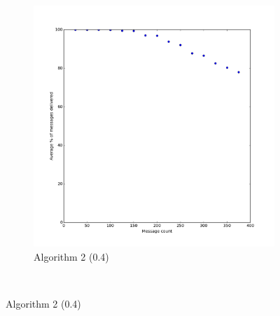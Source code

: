 \documentclass[bsc,frontabs,twoside,singlespacing,parskip,deptreport]{infthesis}     %
\begin{document}
\begin{figure}
\begin{subfigure}[b]{0.3\textwidth}
        \includegraphics[width=\textwidth]{results/BasicShare_Prob40}
        \caption{Algorithm 2 (0.4)}
        \label{fig:results/BasicShare_Prob40}
    \end{subfigure}
    ~ %
    


\end{figure}
\end{document}
